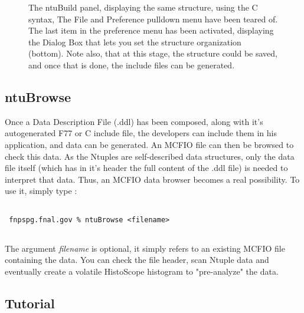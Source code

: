 \begin{figure} 
\begin{center}
\leavevmode
\epsfysize=350pt
\caption{The ntuBuild panel, displaying the same structure, using the C syntax,
The File and Preference pulldown menu have been teared of.  The last item in the 
preference menu  has been activated, displaying the Dialog Box that lets you 
set the structure organization (bottom).  Note also, that at this stage, the 
structure could be saved, and once that is done, the include files can be 
generated. } 
\label{ntuBuild2}
\end{center} 
\end{figure}

\subsection{ntuBrowse}

Once a Data Description File (.ddl) has been composed, along with it's
autogenerated F77 or C include file, the developers can include them in his
application, and data can be generated.  An MCFIO file can then be browsed to
check  this data.  As the Ntuples are self-described data structures, only the
data file itself (which has in it's header the full content of the .ddl file) is
needed to interpret that data.  Thus, an MCFIO data browser becomes a real
possibility. To use it, simply type :

\begin{verbatim}
     
 fnpspg.fnal.gov % ntuBrowse <filename>
 
\end{verbatim}

	The argument {\em filename} is optional, it simply refers to an 
existing MCFIO file containing the data.  You can check the file header, scan
Ntuple data and eventually create a volatile HistoScope histogram to
"pre-analyze" the data. 

   

\subsection{Tutorial}

